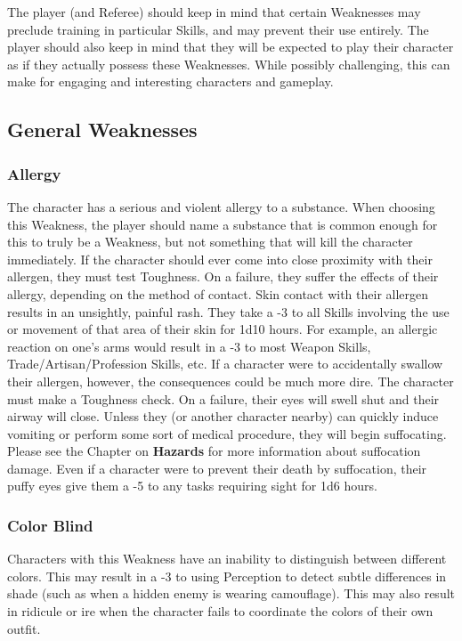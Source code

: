 \documentclass[oneside]{book}
\begin{document}
The player (and Referee) should keep in mind that certain Weaknesses may preclude training in particular Skills, and may prevent their use entirely. The player should also keep in mind that they will be expected to play their character as if they actually possess these Weaknesses. While possibly challenging, this can make for engaging and interesting characters and gameplay.  
\newpage
\begin{multicols}{2}
\section{General Weaknesses}
\subsubsection{Allergy}
The character has a serious and violent allergy to a substance. When choosing this Weakness, the player should name a substance that is common enough for this to truly be a Weakness, but not something that will kill the character immediately. If the character should ever come into close proximity with their allergen, they must test Toughness. On a failure, they suffer the effects of their allergy, depending on the method of contact. Skin contact with their allergen results in an unsightly, painful rash. They take a -3 to all Skills involving the use or movement of that area of their skin for 1d10 hours. For example, an allergic reaction on one's arms would result in a -3 to most Weapon Skills, Trade/Artisan/Profession Skills, etc. If a character were to accidentally swallow their allergen, however, the consequences could be much more dire. The character must make a Toughness check. On a failure, their eyes will swell shut and their airway will close. Unless they (or another character nearby) can quickly induce vomiting or perform some sort of medical procedure, they will begin suffocating. Please see the Chapter on \textbf{Hazards} for more information about suffocation damage. Even if a character were to prevent their death by suffocation, their puffy eyes give them a -5 to any tasks requiring sight for 1d6 hours.
\subsubsection{Color Blind}
Characters with this Weakness have an inability to distinguish between different colors. This may result in a -3 to using Perception to detect subtle differences in shade (such as when a hidden enemy is wearing camouflage). This may also result in ridicule or ire when the character fails to coordinate the colors of their own outfit. 

\end{multicols}
\end{document}

